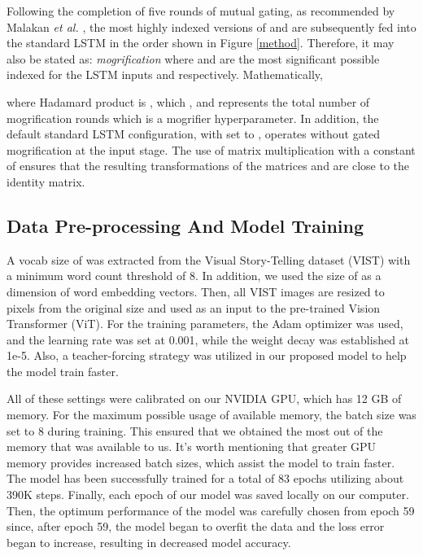 \documentclass[runningheads]{llncs}
\begin{document}
Following the completion of five rounds of mutual gating, as recommended by Malakan \textit{et al.} \cite{9647213}, the most highly indexed versions of  and  are subsequently fed into  the standard LSTM in the order shown in Figure \ref{method}. Therefore, it may also be stated as: {\em mogrification}  where  and  are the most significant possible indexed for the LSTM inputs  and  respectively. Mathematically,

\vspace{-3mm}

where Hadamard product is , which ,  and  represents the total number of mogrification rounds which is a mogrifier hyperparameter. In addition, the default standard LSTM configuration, with  set to , operates without gated mogrification at the input stage. The use of matrix multiplication with a constant of  ensures that the resulting transformations of the matrices  and  are close to the identity matrix.


\subsection{Data Pre-processing And Model Training}
A vocab size of  was extracted from the Visual Story-Telling dataset (VIST) with a minimum word count threshold of 8. In addition, we used the size of  as a dimension of word embedding vectors. Then, all VIST images are resized to    pixels from the original size and used as an input to the pre-trained Vision Transformer (ViT). For the training parameters, the Adam optimizer was used, and the learning rate was set at 0.001, while the weight decay was established at 1e-5. Also, a teacher-forcing strategy was utilized in our proposed model to help the model train faster. 

All of these settings were calibrated on our NVIDIA GPU, which has 12 GB of memory. For the maximum possible usage of available memory, the batch size was set to 8 during training. This ensured that we obtained the most out of the memory that was available to us. It's worth mentioning that greater GPU memory provides increased batch sizes, which assist the model to train faster. The model has been successfully trained for a total of 83 epochs utilizing about 390K steps. Finally, each epoch of our model was saved locally on our computer. Then, the optimum performance of the model was carefully chosen from epoch 59 since, after epoch 59, the model began to overfit the data and the loss error began to increase, resulting in decreased model accuracy.
\end{document}
